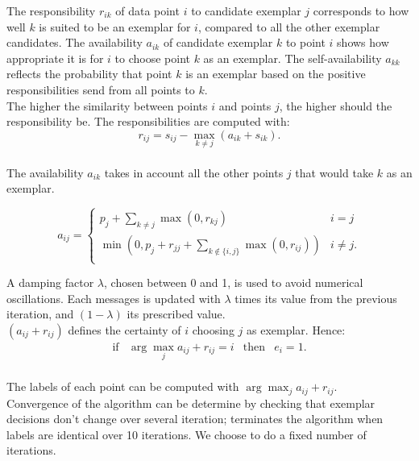 \documentclass{ipol}
\begin{document}
The responsibility $r_{ik}$ of data point $i$ to candidate exemplar $j$
corresponds to how well $k$ is suited to be an exemplar for $i$, compared to
all the other exemplar candidates. The availability $a_{ik}$ of candidate
exemplar $k$ to point $i$ shows how appropriate it is for $i$ to choose point
$k$ as an exemplar. The self-availability $a_{kk}$ reflects the probability
that point $k$ is an exemplar based on the positive responsibilities send from
all points to $k$. \\

The higher the similarity between points $i$ and points $j$, the higher should
the responsibility be. The responsibilities are computed with:
\begin{equation*}
r_{ij} = s_{ij} - \max_{k \neq j}
(a_{ik} + s_{ik}).
\end{equation*} \\

The availability $a_{ik}$  takes in account all the other points $j$ that
would take $k$ as an exemplar.

\begin{equation*}
a_{ij} = \begin{cases}
	    p_j + \sum_{k \neq j} \max(0, r_{kj}) &  i = j \\
	    \min ( 0, p_j + r_{jj} + \sum_{k \notin \{i, j\} } \max (0, r_{ij}))
	    & i \neq j.\\
	 \end{cases}
\end{equation*}

A damping factor $\lambda$, chosen between 0 and 1, is used to avoid
numerical oscillations. Each messages is updated with $\lambda$ times its
value from the previous iteration, and $(1 - \lambda)$ its prescribed value.
\\

$(a_{ij} + r_{ij})$ defines the certainty of $i$ choosing $j$ as exemplar.
Hence:
\begin{equation*}
\begin{array}{cccc}
\text{if} & \arg \max_j a_{ij} + r_{ij} = i & \text{then} & e_i = 1. \\
\end{array}
\end{equation*}

The labels of each point can be computed with $\arg \max_j a_{ij} + r_{ij}$.
\\

Convergence of the algorithm can be determine by checking that exemplar
decisions don't change over several iteration;
\cite{frey07affinitypropagation} terminates the algorithm when labels are
identical over 10 iterations. We choose to do a fixed number of iterations.
\end{document}
